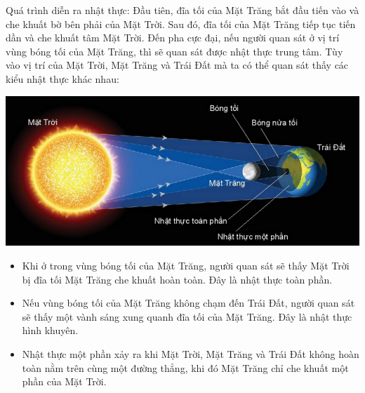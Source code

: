 Quá trình diễn ra nhật thực: Đầu tiên, đĩa tối của Mặt Trăng bắt đầu tiến vào và che khuất bờ bên phải của Mặt Trời. Sau đó, đĩa tối của Mặt Trăng tiếp tục tiến dần và che khuất tâm Mặt Trời. Đến pha cực đại, nếu người quan sát ở vị trí vùng bóng tối của Mặt Trăng, thì sẽ quan sát được nhật thực trung tâm. Tùy vào vị trí của Mặt Trời, Mặt Trăng và Trái Đất mà ta có thể quan sát thấy các kiểu nhật thực khác nhau:
\begin{center}
	\includegraphics[width=0.6\linewidth]{../figs/G10-035-2}
\end{center}
\begin{itemize}
	\item Khi ở trong vùng bóng tối của Mặt Trăng, người quan sát sẽ thấy Mặt Trời bị đĩa tối Mặt Trăng che khuất hoàn toàn. Đây là nhật thực toàn phần.
	\item Nếu vùng bóng tối của Mặt Trăng không chạm đến Trái Đất, người quan sát sẽ thấy một vành sáng xung quanh đĩa tối của Mặt Trăng. Đây là nhật thực hình khuyên.
	\item Nhật thực một phần xảy ra khi Mặt Trời, Mặt Trăng và Trái Đất không hoàn toàn nằm trên cùng một đường thẳng, khi đó Mặt Trăng chỉ che khuất một phần của Mặt Trời.
\end{itemize}

